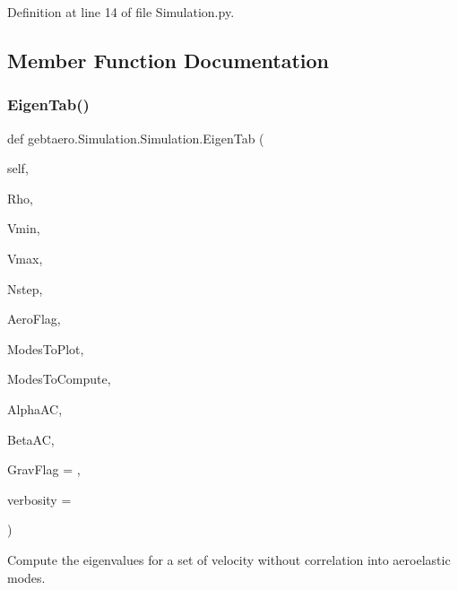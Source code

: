 Definition at line 14 of file Simulation.\+py.



\subsection{Member Function Documentation}
\mbox{\label{classgebtaero_1_1_simulation_1_1_simulation_a2907ad4a52664321ef36ca2d05a5ea64}} 
\subsubsection{\texorpdfstring{Eigen\+Tab()}{EigenTab()}}
{\footnotesize\ttfamily def gebtaero.\+Simulation.\+Simulation.\+Eigen\+Tab (\begin{DoxyParamCaption}\item[{}]{self,  }\item[{}]{Rho,  }\item[{}]{Vmin,  }\item[{}]{Vmax,  }\item[{}]{Nstep,  }\item[{}]{Aero\+Flag,  }\item[{}]{Modes\+To\+Plot,  }\item[{}]{Modes\+To\+Compute,  }\item[{}]{Alpha\+AC,  }\item[{}]{Beta\+AC,  }\item[{}]{Grav\+Flag = {},  }\item[{}]{verbosity = {} }\end{DoxyParamCaption})}



Compute the eigenvalues for a set of velocity without correlation into aeroelastic modes. 


